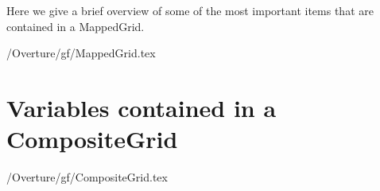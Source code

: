\documentclass{article}
\begin{document}
Here we give a brief overview of some of the most important
items that are contained in a MappedGrid.

 \homeHenshaw/Overture/gf/MappedGrid.tex

\vfill\eject
\section{Variables contained in a CompositeGrid} \label{sec:CompositeGrid}

 \homeHenshaw/Overture/gf/CompositeGrid.tex






\printindex
\end{document}
